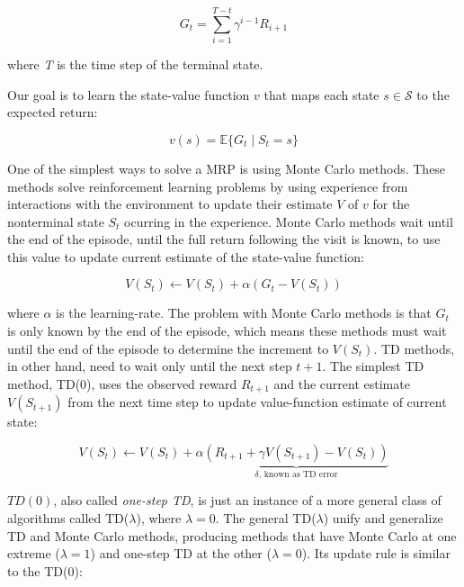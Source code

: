 \documentclass{article}
\begin{document}
\begin{equation}
    G_{t} = \sum_{i=1}^{T-t} \gamma^{i-1} R_{i+1}\label{eqn:1}
\end{equation}

where \emph{T} is the time step of the terminal state.

Our goal is to learn the state-value function $v$ that maps each state $s \in \mathcal{S}$ to the expected return:

\begin{equation}
    v(s) = \mathbb{E}\{G_{t} \mid S_{t} = s\}\label{eqn:2}
\end{equation}

One of the simplest ways to solve a MRP is using Monte Carlo methods.
These methods solve reinforcement learning problems by using experience from interactions with the environment to update their estimate $V$ of $v$ for the nonterminal state $S_{t}$ ocurring in the experience.
Monte Carlo methods wait until the end of the episode, until the full return following the visit is known, to use this value to update current estimate of the state-value function:

\begin{equation}
    V(S_{t}) \leftarrow V(S_{t}) + \alpha(G_{t} - V(S_{t}))\label{eqn:3}
\end{equation}


where $\alpha$ is the learning-rate.
The problem with Monte Carlo methods is that $G_{t}$ is only known by the end of the episode, which means these methods must wait until the end of the episode to determine the increment to $V(S_{t})$.
TD methods, in other hand, need to wait only until the next step $t + 1$.
The simplest TD method, TD(0), uses the observed reward $R_{t+1}$ and the current estimate $V(S_{t+1})$ from the next time step to update value-function estimate of current state:

\begin{equation}
    V(S_{t}) \leftarrow V(S_{t}) + \alpha \underbrace{(R_{t+1} + \gamma V(S_{t+1}) - V(S_{t}))}_{\delta \text{, known as TD error}} \label{eqn:4}
\end{equation}

$TD(0)$, also called \emph{one-step TD}, is just an instance of a more general class of algorithms called TD($\lambda$), where $\lambda = 0$.
The general TD($\lambda$) unify and generalize TD and Monte Carlo methods, producing methods that have Monte Carlo at one extreme ($\lambda = 1$) and one-step TD at the other ($\lambda = 0$).
Its update rule is similar to the TD(0):
\end{document}
